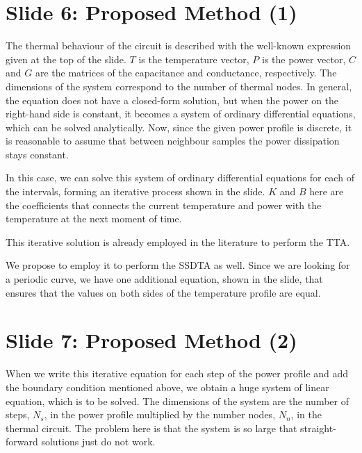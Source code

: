 \documentclass[11pt,a4paper]{article}
\begin{document}
\section{Slide 6: Proposed Method (1)}
The thermal behaviour of the circuit is described with the well-known expression given at the top of the slide. $T$ is the temperature vector, $P$ is the power vector, $C$ and $G$ are the matrices of the capacitance and conductance, respectively. The dimensions of the system correspond to the number of thermal nodes. In general, the equation does not have a closed-form solution, but when the power on the right-hand side is constant, it becomes a system of ordinary differential equations, which can be solved analytically. Now, since the given power profile is discrete, it is reasonable to assume that between neighbour samples the power dissipation stays constant.

In this case, we can solve this system of ordinary differential equations for each of the intervals, forming an iterative process shown in the slide. $K$ and $B$ here are the coefficients that connects the current temperature and power with the temperature at the next moment of time.

This iterative solution is already employed in the literature to perform the TTA.

We propose to employ it to perform the SSDTA as well. Since we are looking for a periodic curve, we have one additional equation, shown in the slide, that ensures that the values on both sides of the temperature profile are equal.

\section{Slide 7: Proposed Method (2)}
When we write this iterative equation for each step of the power profile and add the boundary condition mentioned above, we obtain a huge system of linear equation, which is to be solved. The dimensions of the system are the number of steps, $N_s$, in the power profile multiplied by the number nodes, $N_n$, in the thermal circuit. The problem here is that the system is so large that straight-forward solutions just do not work.
\end{document}
